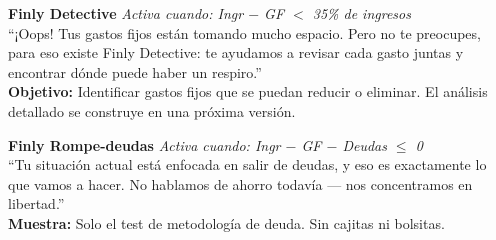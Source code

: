 \documentclass[a4paper,11pt]{article}
\begin{document}
\begin{mdframed}[backgroundcolor=cblue!5,linecolor=cblue!30,linewidth=1pt,roundcorner=6pt]
\textbf{\color{cblue!70!black}Finly Detective}
\hfill\textit{\scriptsize Activa cuando: Ingr $-$ GF $<$ 35\% de ingresos}\\[4pt]
\textcolor{cdark!70}{\small
``¡Oops! Tus gastos fijos est\'an tomando mucho espacio. Pero no te preocupes,
para eso existe Finly Detective: te ayudamos a revisar cada gasto juntas y
encontrar d\'onde puede haber un respiro.''}\\[4pt]
\textbf{\color{cdark!60}\small Objetivo:}
\textcolor{cdark!60}{\small Identificar gastos fijos que se puedan reducir o eliminar.
El an\'alisis detallado se construye en una pr\'oxima versi\'on.}
\end{mdframed}

\vspace{0.3cm}

\begin{mdframed}[backgroundcolor=cred!5,linecolor=cred!30,linewidth=1pt,roundcorner=6pt]
\textbf{\color{cred!70!black}Finly Rompe-deudas}
\hfill\textit{\scriptsize Activa cuando: Ingr $-$ GF $-$ Deudas $\leq$ 0}\\[4pt]
\textcolor{cdark!70}{\small
``Tu situaci\'on actual est\'a enfocada en salir de deudas, y eso es exactamente
lo que vamos a hacer. No hablamos de ahorro todav\'ia --- nos concentramos en
libertad.''}\\[4pt]
\textbf{\color{cdark!60}\small Muestra:} \textcolor{cdark!60}{\small Solo el test de metodolog\'ia de deuda.
Sin cajitas ni bolsitas.}
\end{mdframed}

\vspace{0.4cm}
\end{document}
